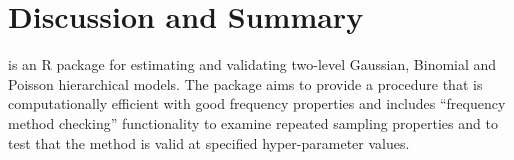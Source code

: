\documentclass[article]{jss}
\begin{document}




\section[Discussion]{Discussion and Summary} \label{discussion}
 is an R package for estimating and validating two-level Gaussian, Binomial and Poisson hierarchical models. The package aims to provide a procedure that is computationally efficient with good frequency properties and includes ``frequency method checking'' functionality to examine repeated sampling properties and to test that the method is valid at specified hyper-parameter values.
\end{document}
